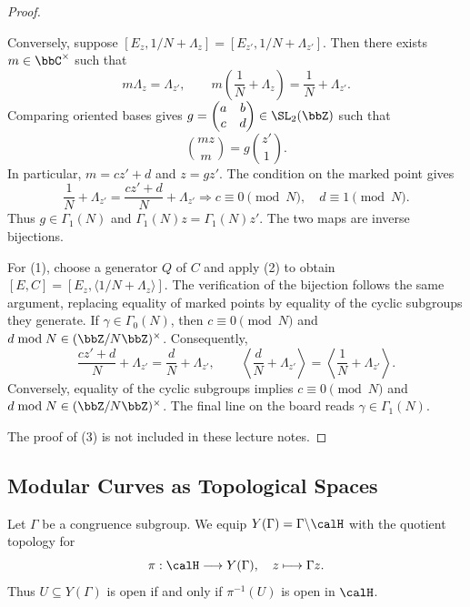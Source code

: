 \begin{proof}
\begin{enumerate}[label=\textit{Step~\arabic*.}]
        Conversely, suppose $[E_z, 1/N + \Lambda_z] = [E_{z'}, 1/N + \Lambda_{z'}]$. Then there exists $m \in \bbC^\times$ such that
        \[
            m\Lambda_z = \Lambda_{z'}, \qquad m\left(\frac{1}{N} + \Lambda_z\right) = \frac{1}{N} + \Lambda_{z'}.
        \]
        Comparing oriented bases gives $g = \begin{pmatrix}a & b\\ c & d\end{pmatrix} \in \SL_2(\bbZ)$ such that
        \[
            \binom{mz}{m} = g\binom{z'}{1}.
        \]
        In particular, $m = cz' + d$ and $z = gz'$. The condition on the marked point gives
        \[
            \frac{1}{N} + \Lambda_{z'} = \frac{cz' + d}{N} + \Lambda_{z'} \Longrightarrow c \equiv 0 \pmod N, \quad d \equiv 1 \pmod N.
        \]
        Thus $g \in \Gamma_1(N)$ and $\Gamma_1(N)z = \Gamma_1(N)z'$. The two maps are inverse bijections.
    \end{enumerate}

    For (1), choose a generator $Q$ of $C$ and apply (2) to obtain $[E, C] = [E_z, \langle 1/N + \Lambda_z\rangle]$. The verification of the bijection follows the same argument, replacing equality of marked points by equality of the cyclic subgroups they generate. If $\gamma \in \Gamma_0(N)$, then $c \equiv 0 \pmod N$ and $d \bmod N \in (\bbZ/N\bbZ)^\times$. Consequently,
    \[
        \frac{cz' + d}{N} + \Lambda_{z'} = \frac{d}{N} + \Lambda_{z'}, \qquad \left\langle\frac{d}{N} + \Lambda_{z'}\right\rangle = \left\langle\frac{1}{N} + \Lambda_{z'}\right\rangle.
    \]
    Conversely, equality of the cyclic subgroups implies $c \equiv 0 \pmod N$ and $d \bmod N \in (\bbZ/N\bbZ)^\times$. The final line on the board reads $\gamma \in \Gamma_1(N)$.

    The proof of (3) is not included in these lecture notes.
\end{proof}

\subsection{Modular Curves as Topological Spaces}\label{Sec:MF_modular_curve_topology}

Let $\Gamma$ be a congruence subgroup. We equip $Y(\Gamma) = \Gamma \backslash \calH$ with the quotient topology for
\[
    \pi : \calH \longrightarrow Y(\Gamma), \quad z \longmapsto \Gamma z.
\]
Thus $U \subseteq Y(\Gamma)$ is open if and only if $\pi^{-1}(U)$ is open in $\calH$.

